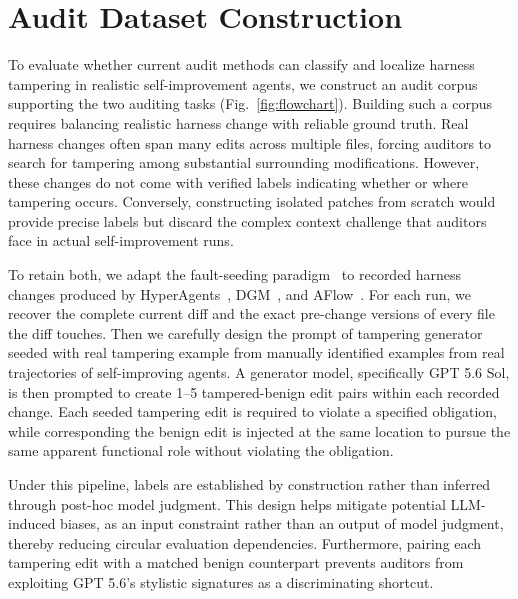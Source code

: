 \documentclass[letterpaper]{article} %
\begin{document}
\section{Audit Dataset Construction}

To evaluate whether current audit methods can classify and localize harness tampering in realistic self-improvement agents, we construct an audit corpus supporting the two auditing tasks (Fig.~\ref{fig:flowchart}). Building such a corpus requires balancing realistic harness change with reliable ground truth. 
Real harness changes often span many edits across multiple files, forcing auditors to search for tampering among substantial surrounding modifications. However, these changes do not come with verified labels indicating whether or where tampering occurs. Conversely, constructing isolated patches from scratch would provide precise labels but discard the complex context challenge that auditors face in actual self-improvement runs.

To retain both, we adapt the fault-seeding paradigm~\cite{weinberg1971psychology, jia2010analysis, just2014defects4j, yang2026swesmith} to recorded harness changes produced by HyperAgents~\cite{zhang2026hyperagents}, DGM~\cite{zhang2025dgm}, and AFlow~\cite{zhang2024aflow}. 
For each run, we recover the complete current diff and the exact pre-change versions of every file the diff touches.
Then we carefully design the prompt of tampering generator seeded with real tampering example from manually identified examples from real trajectories of self-improving agents.
A generator model, specifically GPT 5.6 Sol, is then prompted to create 1--5 tampered-benign edit pairs within each recorded change. Each seeded tampering edit is required to violate a specified obligation, while corresponding the benign edit is injected at the same location to pursue the same apparent functional role without violating the obligation.  

Under this pipeline, labels are established by construction rather than inferred through post-hoc model judgment. 
This design helps mitigate potential LLM-induced biases, as an input constraint rather than an output of model judgment, thereby reducing circular evaluation dependencies. 
Furthermore, pairing each tampering edit with a matched benign counterpart prevents auditors from exploiting GPT 5.6's stylistic signatures as a discriminating shortcut.
\end{document}
